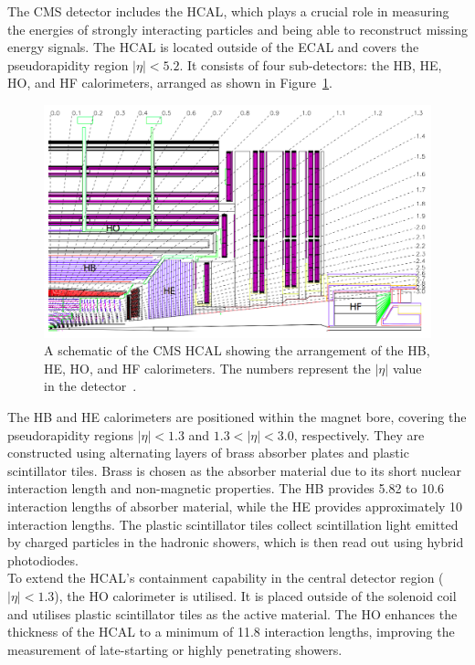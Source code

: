 The \ac{CMS} detector includes the \ac{HCAL}, which plays a crucial role in measuring the energies of strongly interacting particles and being able to reconstruct missing energy signals. 
The \ac{HCAL} is located outside of the \ac{ECAL} and covers the pseudorapidity region $|\eta| < 5.2$. 
It consists of four sub-detectors: the \ac{HB}, \ac{HE}, \ac{HO}, and \ac{HF} calorimeters, arranged as shown in Figure~\ref{fig:hcal}.

\begin{figure}[!hbtp]
    \centering
    \includegraphics[width=\textwidth]{Figures/HCAL.png}
    \caption[Diagram of the CMS HCAL.]{A schematic of the CMS HCAL showing the arrangement of the HB, HE, HO, and HF calorimeters. The numbers represent the $|\eta|$ value in the detector~\cite{CMS_Setup}.}
    \label{fig:hcal}
\end{figure}

The \ac{HB} and \ac{HE} calorimeters are positioned within the magnet bore, covering the pseudorapidity regions $|\eta| < 1.3$ and $1.3 < |\eta| < 3.0$, respectively. 
They are constructed using alternating layers of brass absorber plates and plastic scintillator tiles. 
Brass is chosen as the absorber material due to its short nuclear interaction length and non-magnetic properties. 
The \ac{HB} provides 5.82 to 10.6 interaction lengths of absorber material, while the \ac{HE} provides approximately 10 interaction lengths. 
The plastic scintillator tiles collect scintillation light emitted by charged particles in the hadronic showers, which is then read out using hybrid photodiodes. \\

To extend the \ac{HCAL}'s containment capability in the central detector region ($|\eta| < 1.3$), the \ac{HO} calorimeter is utilised. 
It is placed outside of the solenoid coil and utilises plastic scintillator tiles as the active material. 
The \ac{HO} enhances the thickness of the \ac{HCAL} to a minimum of 11.8 interaction lengths, improving the measurement of late-starting or highly penetrating showers. \\

